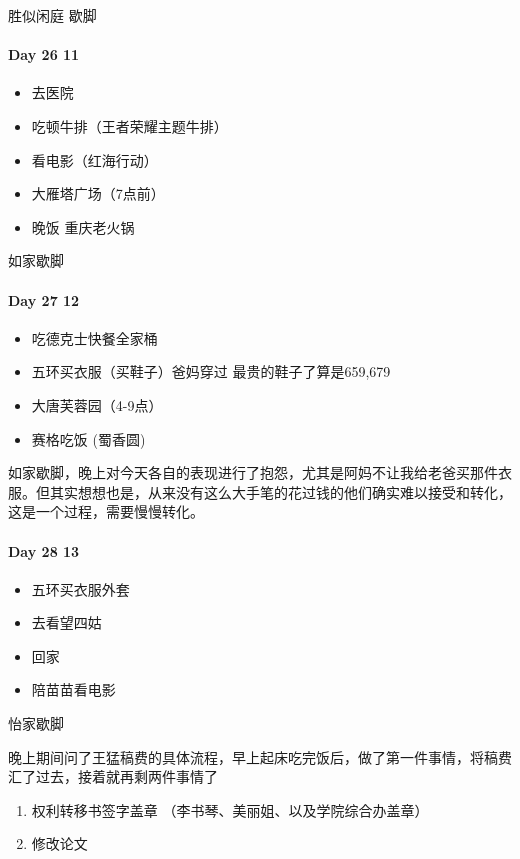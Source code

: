\documentclass[UTF8,a4paper,8pt]{ctexart}
\begin{document}
		胜似闲庭 歇脚
	\paragraph{Day 26  11    \quad     }
		\begin{itemize}
			\item 去医院
			\item 吃顿牛排（王者荣耀主题牛排）
			\item 看电影（红海行动）
			\item 大雁塔广场（7点前）
			\item 晚饭 重庆老火锅
		\end{itemize}
		
		如家歇脚
	\paragraph{Day 27  12    \quad     }
		\begin{itemize}
			\item 吃德克士快餐全家桶
			\item 五环买衣服（买鞋子）爸妈穿过 最贵的鞋子了算是659,679
			\item 大唐芙蓉园（4-9点）
			\item 赛格吃饭 (蜀香圆)
		\end{itemize}
		
		如家歇脚，晚上对今天各自的表现进行了抱怨，尤其是阿妈不让我给老爸买那件衣服。但其实想想也是，从来没有这么大手笔的花过钱的他们确实难以接受和转化，这是一个过程，需要慢慢转化。
		
	\paragraph{Day 28  13   \quad     }
		\begin{itemize}
			\item 五环买衣服外套
			\item 去看望四姑
			\item 回家
			\item 陪苗苗看电影
		\end{itemize}
		
		怡家歇脚

		晚上期间问了王猛稿费的具体流程，早上起床吃完饭后，做了第一件事情，将稿费汇了过去，接着就再剩两件事情了
		
			\begin{enumerate}
				\item 权利转移书签字盖章 （李书琴、美丽姐、以及学院综合办盖章）
				\item 修改论文
			\end{enumerate}
		
\end{document}
